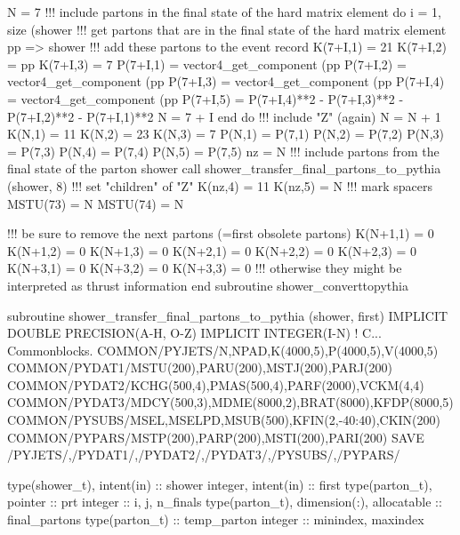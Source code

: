     N = 7
    !!! include partons in the final state of the hard matrix element
    do i = 1, size (shower%
       !!! get partons that are in the final state of the hard matrix element
       pp => shower%
       !!! add these partons to the event record
       K(7+I,1) = 21
       K(7+I,2) = pp%
       K(7+I,3) = 7
       P(7+I,1) = vector4_get_component (pp%
       P(7+I,2) = vector4_get_component (pp%
       P(7+I,3) = vector4_get_component (pp%
       P(7+I,4) = vector4_get_component (pp%
       P(7+I,5) = P(7+I,4)**2 - P(7+I,3)**2 - P(7+I,2)**2 - P(7+I,1)**2
       N = 7 + I
    end do
    !!! include "Z" (again)
    N = N + 1
    K(N,1) = 11
    K(N,2) = 23
    K(N,3) = 7
    P(N,1) = P(7,1)
    P(N,2) = P(7,2)
    P(N,3) = P(7,3)
    P(N,4) = P(7,4)
    P(N,5) = P(7,5)
    nz = N
    !!! include partons from the final state of the parton shower
    call shower_transfer_final_partons_to_pythia (shower, 8)
    !!! set "children" of "Z"
    K(nz,4) = 11
    K(nz,5) = N
    !!! mark spacers
    MSTU(73) = N
    MSTU(74) = N

    !!! be sure to remove the next partons (=first obsolete partons)
    K(N+1,1) = 0
    K(N+1,2) = 0
    K(N+1,3) = 0
    K(N+2,1) = 0
    K(N+2,2) = 0
    K(N+2,3) = 0
    K(N+3,1) = 0
    K(N+3,2) = 0
    K(N+3,3) = 0
    !!! otherwise they might be interpreted as thrust information
  end subroutine shower_converttopythia

\eatline
\nwendcode{}\nwdocspar
\nwenddocs{}\plusendmoddef
  subroutine shower_transfer_final_partons_to_pythia (shower, first)
    IMPLICIT DOUBLE PRECISION(A-H, O-Z)
    IMPLICIT INTEGER(I-N)
    !    C...  Commonblocks.
    COMMON/PYJETS/N,NPAD,K(4000,5),P(4000,5),V(4000,5)
    COMMON/PYDAT1/MSTU(200),PARU(200),MSTJ(200),PARJ(200)
    COMMON/PYDAT2/KCHG(500,4),PMAS(500,4),PARF(2000),VCKM(4,4)
    COMMON/PYDAT3/MDCY(500,3),MDME(8000,2),BRAT(8000),KFDP(8000,5)
    COMMON/PYSUBS/MSEL,MSELPD,MSUB(500),KFIN(2,-40:40),CKIN(200)
    COMMON/PYPARS/MSTP(200),PARP(200),MSTI(200),PARI(200)
    SAVE /PYJETS/,/PYDAT1/,/PYDAT2/,/PYDAT3/,/PYSUBS/,/PYPARS/

    type(shower_t), intent(in) :: shower
    integer, intent(in) :: first
    type(parton_t), pointer :: prt
    integer :: i, j, n_finals
    type(parton_t), dimension(:), allocatable :: final_partons
    type(parton_t) :: temp_parton
    integer :: minindex, maxindex

